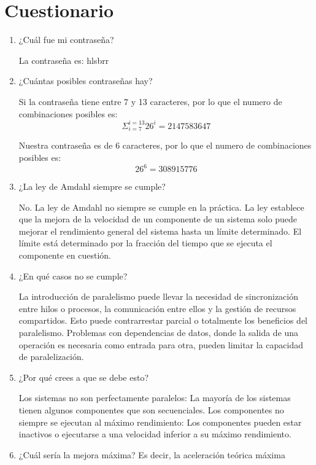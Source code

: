 \documentclass{article}
\begin{document}
\section{Cuestionario}
\begin{enumerate}
    \item ¿Cuál fue mi contraseña?
    
    La contraseña es: hlsbrr

    \item ¿Cuántas posibles contraseñas hay?

    Si la contraseña tiene entre 7 y 13 caracteres, por lo que el numero de combinaciones posibles es:
    \[ \Sigma_{i=7}^{i=13} 26^i = 2 147 583 647\]

    Nuestra contraseña es de 6 caracteres, por lo que el numero de combinaciones posibles es:
    \[ 26^6 = 308 915 776\]

    \item ¿La ley de Amdahl siempre se cumple?
    
    No. La ley de Amdahl no siempre se cumple en la práctica. La ley establece que la mejora de la velocidad de un componente de un sistema solo puede mejorar el rendimiento general del sistema hasta un límite determinado. El límite está determinado por la fracción del tiempo que se ejecuta el componente en cuestión.

    \item ¿En qué casos no se cumple?
    
    La introducción de paralelismo puede llevar la necesidad de sincronización entre hilos o procesos, la comunicación entre ellos y la gestión de recursos compartidos. Esto puede contrarrestar parcial o totalmente los beneficios del paralelismo. Problemas con dependencias de datos, donde la salida de una operación es necesaria como entrada para otra, pueden limitar la capacidad de paralelización. 
   
    \item ¿Por qué crees a que se debe esto?
    
    Los sistemas no son perfectamente paralelos: La mayoría de los sistemas tienen algunos componentes que son secuenciales.
    Los componentes no siempre se ejecutan al máximo rendimiento: Los componentes pueden estar inactivos o ejecutarse a una velocidad inferior a su máximo rendimiento.

    \item ¿Cuál sería la mejora máxima? Es decir, la aceleración teórica máxima
    

\end{enumerate}
\end{document}
